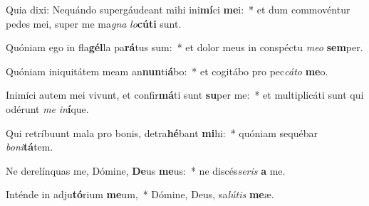 \item Quia dixi: Nequándo supergáudeant mihi ini\textbf{mí}ci \textbf{me}i:~* et dum commovéntur pedes mei, super me ma\textit{gna} \textit{lo}\textbf{cú}\textbf{ti} sunt.
\item Quóniam ego in fla\textbf{gél}la pa\textbf{rá}tus sum:~* et dolor meus in conspéctu \textit{me}\textit{o} \textbf{sem}per.
\item Quóniam iniquitátem meam an\textbf{nun}ti\textbf{á}bo:~* et cogitábo pro pec\textit{cá}\textit{to} \textbf{me}o.
\item Inimíci autem mei vivunt, et confir\textbf{má}ti sunt \textbf{su}per me:~* et multiplicáti sunt qui odérunt \textit{me} \textit{in}\textbf{í}que.
\item Qui retríbuunt mala pro bonis, detra\textbf{hé}bant \textbf{mi}hi:~* quóniam sequébar \textit{bo}\textit{ni}\textbf{tá}tem.
\item Ne derelínquas me, Dómine, \textbf{De}us \textbf{me}us:~* ne discés\textit{se}\textit{ris} \textbf{a} me.
\item Inténde in adju\textbf{tó}rium \textbf{me}um,~* Dómine, Deus, sa\textit{lú}\textit{tis} \textbf{me}æ.
